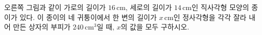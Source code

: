 \noindent\begin{minipage}[t]{0.58\linewidth}\vspace{0pt}\raggedright 오른쪽 그림과 같이 가로의 길이가 $16\,\mathrm{cm}$, 세로의 길이가 $14\,\mathrm{cm}$인 직사각형 모양의 종이가 있다. 이 종이의 네 귀퉁이에서 한 변의 길이가 $x\,\mathrm{cm}$인 정사각형을 각각 잘라 내어 만든 상자의 부피가 $240\,\mathrm{cm}^3$일 때, $x$의 값을 모두 구하시오.\end{minipage}\hfill\begin{minipage}[t]{0.4\linewidth}\vspace{0pt}\centering \resizebox{\ifdim\width>\linewidth\linewidth\else\width\fi}{!}{}\end{minipage}\par
